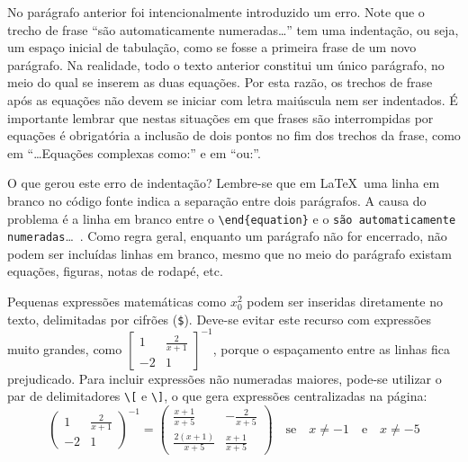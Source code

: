 No parágrafo anterior foi intencionalmente introduzido um erro. Note
que o trecho de frase ``são automaticamente numeradas\dots'' tem uma
indentação, ou seja, um espaço inicial de tabulação, como se fosse a
primeira frase de um novo parágrafo. Na realidade, todo o texto
anterior constitui um único parágrafo, no meio do qual se inserem as
duas equações. Por esta razão, os trechos de frase após as equações
não devem se iniciar com letra maiúscula nem ser indentados. É
importante lembrar que nestas situações em que frases são
interrompidas por equações é obrigatória a inclusão de dois pontos no
fim dos trechos da frase, como em ``\dots Equações complexas como:'' e
em ``ou:''.

O que gerou este erro de indentação? Lembre-se que em \LaTeX\ uma
linha em branco no código fonte indica a separação entre dois
parágrafos. A causa do problema é a linha em branco entre o
\verb|\end{equation}| e o \texttt{são automaticamente
numeradas}\dots~. Como regra geral, enquanto um parágrafo não for
encerrado, não podem ser incluídas linhas em branco, mesmo que no meio
do parágrafo existam equações, figuras, notas de rodapé, etc.

Pequenas expressões matemáticas como $x_0^2$ podem ser inseridas
diretamente no texto, delimitadas por cifrões (\texttt{\$}). Deve-se
evitar este recurso com expressões muito grandes, como
$\left[\begin{array}{cc} 1 & \frac{2}{x+1} \\ -2 &
1\end{array}\right]^{-1}$, porque o espaçamento entre as linhas fica
prejudicado. Para incluir expressões não numeradas maiores, pode-se
utilizar o par de delimitadores \verb|\[| e \verb|\]|, o que gera
expressões centralizadas na página:
\[
\left(\begin{array}{cc}
1 & \frac{2}{x+1} \\ -2 & 1
\end{array}\right)^{-1} = \left(\begin{array}{cc}
\frac{x+1}{x+5} & -\frac{2}{x+5} \\ \frac{2(x+1)}{x+5} & \frac{x+1}{x+5}
\end{array}\right) \quad
\text{se} \quad x \neq -1 \quad \text{e} \quad x \neq -5
\]

